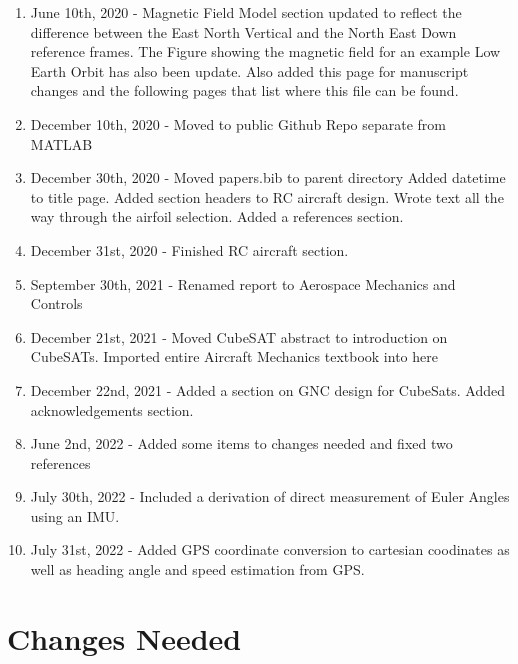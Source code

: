 \documentclass{article}
\begin{document}
\begin{enumerate}[itemsep=-5pt]
\item June 10th, 2020 - Magnetic Field Model section updated to
  reflect the difference between the East North Vertical and the North
  East Down reference frames. The Figure showing the magnetic field
  for an example Low Earth Orbit has also been update. Also added this
  page for manuscript changes and the following pages that list where
  this file can be found.
\item December 10th, 2020 - Moved to public Github Repo separate from
  MATLAB
\item December 30th, 2020 - Moved papers.bib to parent directory Added
  datetime to title page. Added  section headers to RC aircraft
  design. Wrote text all the way through the airfoil selection. Added
  a references section.
\item December 31st, 2020 - Finished RC aircraft section.
\item September 30th, 2021 - Renamed report to Aerospace Mechanics and
  Controls
\item December 21st, 2021 - Moved CubeSAT abstract to introduction on
  CubeSATs. Imported entire Aircraft Mechanics textbook into here
\item December 22nd, 2021 - Added a section on GNC design for
  CubeSats. Added acknowledgements section.
\item June 2nd, 2022 - Added some items to changes needed and fixed
  two references
\item July 30th, 2022 - Included a derivation of direct measurement of Euler Angles using an IMU.
\item July 31st, 2022 - Added GPS coordinate conversion to cartesian coodinates as well as heading angle and speed estimation from GPS.
\end{enumerate}

\section*{Changes Needed}
\end{document}
